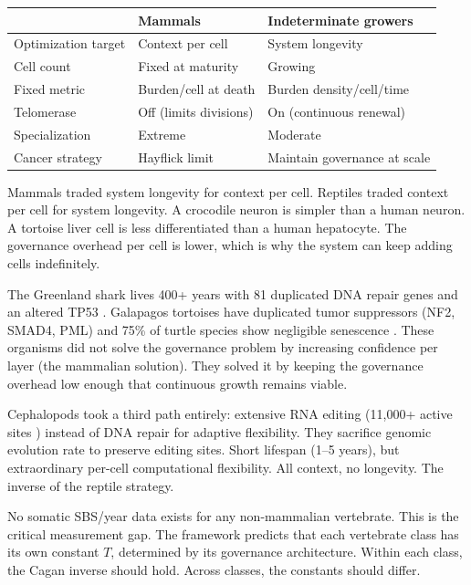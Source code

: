 \documentclass[11pt]{article}
\theoremstyle{definition}
\begin{document}
\begin{center}
\small
\begin{tabular}{lll}
\toprule
& \textbf{Mammals} & \textbf{Indeterminate growers} \\
\midrule
Optimization target & Context per cell & System longevity \\
Cell count & Fixed at maturity & Growing \\
Fixed metric & Burden/cell at death & Burden density/cell/time \\
Telomerase & Off (limits divisions) & On (continuous renewal) \\
Specialization & Extreme & Moderate \\
Cancer strategy & Hayflick limit & Maintain governance at scale \\
\bottomrule
\end{tabular}
\end{center}

Mammals traded system longevity for context per cell. Reptiles traded
context per cell for system longevity. A crocodile neuron is simpler
than a human neuron. A tortoise liver cell is less differentiated than
a human hepatocyte. The governance overhead per cell is lower, which
is why the system can keep adding cells indefinitely.

The Greenland shark lives 400+ years with 81 duplicated DNA repair
genes and an altered TP53 \cite{Spath2024}. Galapagos tortoises have
duplicated tumor suppressors (NF2, SMAD4, PML) and 75\% of
turtle species show negligible senescence \cite{daSilva2022}. These
organisms did not solve the governance problem by increasing
confidence per layer (the mammalian solution). They solved it by
keeping the governance overhead low enough that continuous growth
remains viable.

Cephalopods took a third path entirely: extensive RNA editing
(11,000+ active sites \cite{Liscovitch2017}) instead of DNA repair for adaptive flexibility.
They sacrifice genomic evolution rate to preserve editing sites. Short
lifespan (1--5 years), but extraordinary per-cell computational
flexibility. All context, no longevity. The inverse of the reptile
strategy.

No somatic SBS/year data exists for any non-mammalian vertebrate.
This is the critical measurement gap. The framework predicts that
each vertebrate class has its own constant $T$, determined by
its governance architecture. Within each class, the Cagan inverse
should hold. Across classes, the constants should differ.
\end{document}
